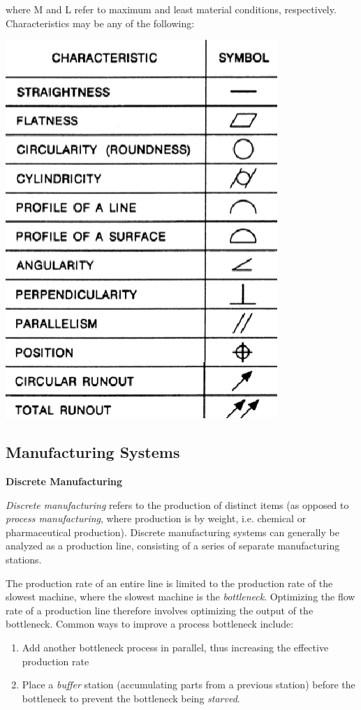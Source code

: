 where M and L refer to maximum and least material conditions, respectively. Characteristics may be any of the following:

\begin{center}
    \includegraphics[scale=0.6]{Images/x50_gd&t2.png}
\end{center}

\subsection{Manufacturing Systems}

\textbf{Discrete Manufacturing}

\textit{Discrete manufacturing} refers to the production of distinct items (as opposed to \textit{process manufacturing}, where production is by weight, i.e. chemical or pharmaceutical production). Discrete manufacturing systems can generally be analyzed as a production line, consisting of a series of separate manufacturing stations.

The production rate of an entire line is limited to the production rate of the slowest machine, where the slowest machine is the \textit{bottleneck}. Optimizing the flow rate of a production line therefore involves optimizing the output of the bottleneck. Common ways to improve a process bottleneck include: \begin{enumerate}
    \item Add another bottleneck process in parallel, thus increasing the effective production rate
    \item Place a \textit{buffer} station (accumulating parts from a previous station) before the bottleneck to prevent the bottleneck being \textit{starved}.
\end{enumerate}


